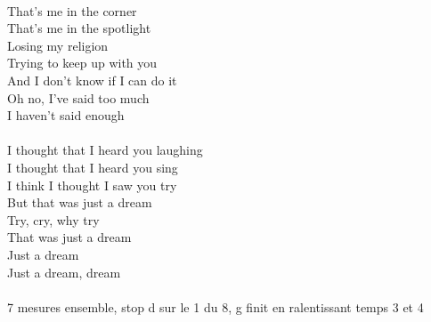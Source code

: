\switchcolumn

{\\
That's me in the corner\\
That's me in the spotlight\\
Losing my religion\\
Trying to keep up with you\\
And I don't know if I can do it\\
Oh no, I've said too much\\
I haven't said enough\\
}
{\\
I thought that I heard you laughing\\
I thought that I heard you sing\\
I think I thought I saw you try\\
But that was just a dream\\
Try, cry, why try\\
That was just a dream\\
Just a dream\\
Just a dream, dream\\
}
    {\\7 mesures ensemble, stop d sur le 1 du 8, g finit en ralentissant temps 3 et 4}


